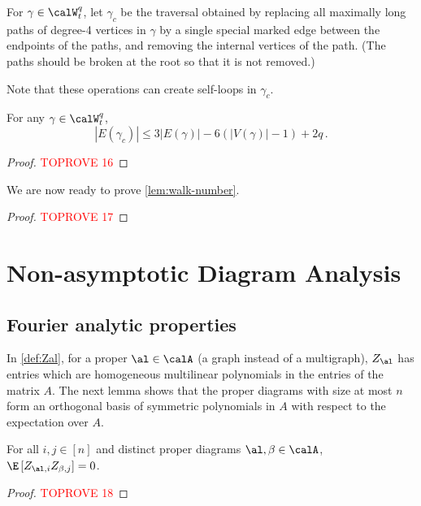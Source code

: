 \documentclass[12pt]{article}
\begin{document}
\begin{definition}\label{def:contracted-walk}
    For $\gamma\in \calW_t^q$, let $\gamma_c$ be the traversal obtained by replacing all maximally long paths of degree-4 vertices in $\gamma$ by a single special marked edge between the endpoints of the paths, and removing the internal vertices of the path.
    (The paths should be broken at the root so that it is not removed.)
\end{definition}

Note that these operations can create self-loops in $\gamma_c$.


\begin{lemma}\label{lem:size-contracted}
    For any $\gamma\in\calW_t^q$,
    \[
        |E(\gamma_c)|\le 3|E(\gamma)|-6(|V(\gamma)|-1)+2q\,.
    \]
\end{lemma}

\begin{proof}\textcolor{red}{TOPROVE 16}\end{proof}

We are now ready to prove \cref{lem:walk-number}.

\begin{proof}\textcolor{red}{TOPROVE 17}\end{proof}
 


{\footnotesize}

\appendix

\section{Non-asymptotic Diagram Analysis}
\label{app:non-asymptotic}

\subsection{Fourier analytic properties}
\label{sec:fourier}

In \cref{def:Zal}, for a proper $\al \in \calA$ (a graph instead of a multigraph), $Z_\al$ has entries which are homogeneous multilinear polynomials in the entries of the matrix $A$.
The next lemma shows that the proper diagrams with size at most $n$ form an orthogonal basis of
symmetric polynomials in $A$ with respect to the expectation over $A$.

\begin{lemma}\label{lem:orthogonality}
    For all $i,j \in [n]$ and distinct proper diagrams $\al, \beta \in \calA$, $\E \left[Z_{\al,i}Z_{\beta,j}\right] = 0$.
\end{lemma}
\begin{proof}\textcolor{red}{TOPROVE 18}\end{proof}
\end{document}
